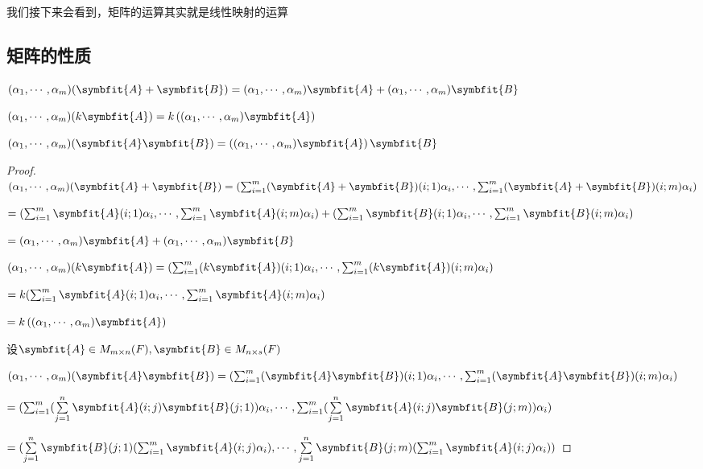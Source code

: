 \documentclass[12pt, a4paper, oneside, UTF8]{ctexbook}
\begin{document}
			我们接下来会看到，矩阵的运算其实就是线性映射的运算
		\subsection{矩阵的性质}
			\begin{para}{0}
				\point{}
					\begin{proposition}
						$(\alpha_1,\cdots,\alpha_m)(\symbfit{A}+\symbfit{B})=(\alpha_1,\cdots,\alpha_m)\symbfit{A}+(\alpha_1,\cdots,\alpha_m)\symbfit{B}$
						
						$(\alpha_1,\cdots,\alpha_m)(k\symbfit{A})=k\left((\alpha_1,\cdots,\alpha_m)\symbfit{A}\right)$

						$(\alpha_1,\cdots,\alpha_m)(\symbfit{A}\symbfit{B})=\left((\alpha_1,\cdots,\alpha_m)\symbfit{A}\right)\symbfit{B}$
					\end{proposition}
					\begin{proof}
						$(\alpha_1,\cdots,\alpha_m)(\symbfit{A}+\symbfit{B})=(\sum_{i=1}^m (\symbfit{A}+\symbfit{B})(i;1)\alpha_i  , \cdots , \sum_{i=1}^m (\symbfit{A}+\symbfit{B})(i;m)\alpha_i)$

						$=(\sum_{i=1}^m \symbfit{A}(i;1)\alpha_i  , \cdots , \sum_{i=1}^m \symbfit{A}(i;m)\alpha_i)+(\sum_{i=1}^m \symbfit{B}(i;1)\alpha_i  , \cdots , \sum_{i=1}^m \symbfit{B}(i;m)\alpha_i)$

						$=(\alpha_1,\cdots,\alpha_m)\symbfit{A}+(\alpha_1,\cdots,\alpha_m)\symbfit{B}$

						$(\alpha_1,\cdots,\alpha_m)(k\symbfit{A})=(\sum_{i=1}^m (k\symbfit{A})(i;1)\alpha_i  , \cdots , \sum_{i=1}^m (k\symbfit{A})(i;m)\alpha_i)$

						$=k(\sum_{i=1}^m \symbfit{A}(i;1)\alpha_i  , \cdots , \sum_{i=1}^m \symbfit{A}(i;m)\alpha_i)$

						$=k\left((\alpha_1,\cdots,\alpha_m)\symbfit{A}\right)$

						设$\symbfit{A} \in M_{m \times n}(F),\symbfit{B} \in M_{n \times s}(F)$
						
						$(\alpha_1,\cdots,\alpha_m)(\symbfit{A}\symbfit{B})=(\sum_{i=1}^m (\symbfit{A}\symbfit{B})(i;1)\alpha_i  , \cdots , \sum_{i=1}^m (\symbfit{A}\symbfit{B})(i;m)\alpha_i)$

						$=(\sum_{i=1}^m (\sum\limits_{j=1}^{n}\symbfit{A}(i;j)\symbfit{B}(j;1))\alpha_i  , \cdots , \sum_{i=1}^m (\sum\limits_{j=1}^{n}\symbfit{A}(i;j)\symbfit{B}(j;m))\alpha_i)$

						$=(\sum\limits_{j=1}^{n}\symbfit{B}(j;1) (\sum_{i=1}^m\symbfit{A}(i;j)\alpha_i)  , \cdots , \sum\limits_{j=1}^{n} \symbfit{B}(j;m)(\sum_{i=1}^m\symbfit{A}(i;j)\alpha_i))$
					

\end{proof}
\end{para}
\end{document}
